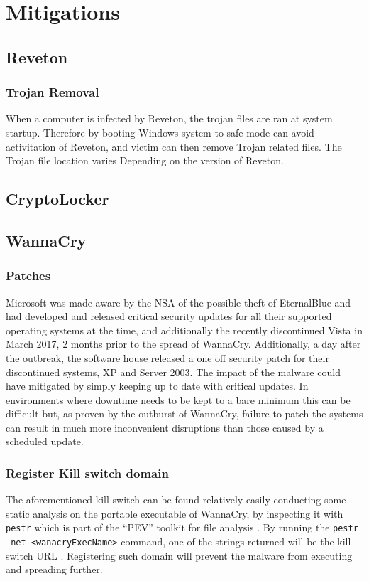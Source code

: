 \documentclass[10pt,a4paper]{article}
\begin{document}
\section{Mitigations}

\subsection{Reveton}

\subsubsection{Trojan Removal}
When a computer is infected by Reveton, the trojan files are ran at system startup. Therefore by booting Windows system to safe mode can avoid activitation of Reveton, and victim can then remove Trojan related files\cite{revetonremoval}. The Trojan file location varies Depending on the version of Reveton.

\subsection{CryptoLocker}

\subsection{WannaCry}

\subsubsection{Patches}
Microsoft was made aware by the NSA of the possible theft of EternalBlue and had developed and released critical security updates for all their supported operating systems at the time, and additionally the recently discontinued Vista in March 2017, 2 months prior to the spread of WannaCry.
Additionally, a day after the outbreak, the software house released a one off security patch for their discontinued systems, XP and Server 2003.
The impact of the malware could have mitigated by simply keeping up to date with critical updates. In environments where downtime needs to be kept to a bare minimum this can be difficult but, as proven by the outburst of WannaCry, failure to patch the systems can result in much more inconvenient disruptions than those caused by a scheduled update.

\subsubsection{Register Kill switch domain}
The aforementioned kill switch can be found relatively easily conducting some static analysis on the portable executable of WannaCry, by inspecting it with \texttt{pestr} which is part of the ``PEV'' toolkit for file analysis \cite{PEtoolkit}. By running the \texttt{pestr --net <wanacryExecName>} command, one of the strings returned will be the kill switch URL \cite{pestrVideo}. Registering such domain will prevent the malware from executing and spreading further.
\end{document}
